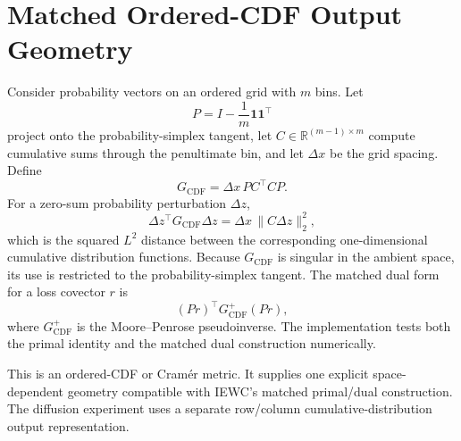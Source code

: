 \section{Matched Ordered-CDF Output Geometry}
\label{app:ordered-cdf-geometry}

Consider probability vectors on an ordered grid with $m$ bins. Let
\[
P=I-\frac{1}{m}\mathbf 1\mathbf 1^\top
\]
project onto the probability-simplex tangent, let
$C\in\mathbb R^{(m-1)\times m}$ compute cumulative sums through the
penultimate bin, and let $\Delta x$ be the grid spacing. Define
\[
G_{\mathrm{CDF}}=\Delta x\,P C^\top C P.
\]
For a zero-sum probability perturbation $\Delta z$,
\[
\Delta z^\top G_{\mathrm{CDF}}\Delta z
=
\Delta x\,\|C\Delta z\|_2^2,
\]
which is the squared $L^2$ distance between the corresponding
one-dimensional cumulative distribution functions. Because
$G_{\mathrm{CDF}}$ is singular in the ambient space, its use is restricted to
the probability-simplex tangent. The matched dual form for a loss covector
$r$ is
\[
(Pr)^\top G_{\mathrm{CDF}}^+(Pr),
\]
where $G_{\mathrm{CDF}}^+$ is the Moore--Penrose pseudoinverse. The
implementation tests both the primal identity and the matched dual
construction numerically.

This is an ordered-CDF or Cram\'er metric. It supplies one explicit
space-dependent geometry compatible with IEWC's matched primal/dual
construction. The diffusion experiment uses a separate row/column
cumulative-distribution output representation.
